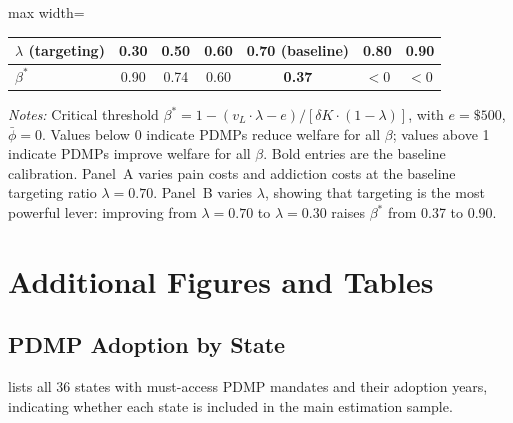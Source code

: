 \documentclass[12pt]{article}
\begin{document}
\begin{table}[htbp]
\centering
\begin{adjustbox}{max width=\textwidth}
\begin{threeparttable}
\begin{tabular}{lcccccc}
\toprule
$\lambda$ (targeting) & 0.30 & 0.50 & 0.60 & 0.70 (baseline) & 0.80 & 0.90 \\
\midrule
$\beta^*$ & 0.90 & 0.74 & 0.60 & \textbf{0.37} & $<0$ & $<0$ \\
\bottomrule
\end{tabular}
\begin{tablenotes}
\footnotesize
\item \textit{Notes:} Critical threshold $\beta^* = 1 - (v_L \cdot \lambda - e)/[\delta K \cdot (1-\lambda)]$, with $e = \$500$, $\bar{\phi} = 0$. Values below 0 indicate PDMPs reduce welfare for all $\beta$; values above 1 indicate PDMPs improve welfare for all $\beta$. Bold entries are the baseline calibration. Panel~A varies pain costs and addiction costs at the baseline targeting ratio $\lambda=0.70$. Panel~B varies $\lambda$, showing that targeting is the most powerful lever: improving from $\lambda=0.70$ to $\lambda=0.30$ raises $\beta^*$ from 0.37 to 0.90.
\end{tablenotes}
\end{threeparttable}
\end{adjustbox}
\end{table}


\section{Additional Figures and Tables}\label{app:additional}

\subsection{PDMP Adoption by State}

 lists all 36 states with must-access PDMP mandates and their adoption years, indicating whether each state is included in the main estimation sample.
\end{document}
